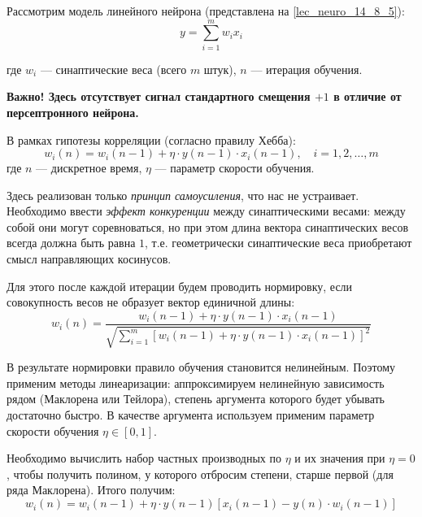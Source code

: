 \documentclass[a4paper]{article}
\numberwithin{equation}{subsection}
\begin{document}
Рассмотрим модель линейного нейрона (представлена на \ref{lec_neuro_14_8_5}):
\begin{equation}
    y = \sum_{i=1}^m w_i x_i
\end{equation}

\noindent
где $w_i$ --- синаптические веса (всего $m$ штук), $n$ --- итерация обучения.

\begin{myquote}
    \textbf{Важно!
    Здесь отсутствует сигнал стандартного смещения $+1$ в отличие от персептронного нейрона.}
\end{myquote}

В рамках гипотезы корреляции (согласно правилу Хебба):
\begin{equation}
    w_i (n) = w_i (n-1) + \eta \cdot y(n-1) \cdot x_i(n-1), \quad i=1, 2, \dots, m
\end{equation}
\noindent
где $n$ --- дискретное время, $\eta$ --- параметр скорости обучения.

Здесь реализован только \textit{принцип самоусиления}, что нас не устраивает. 
Необходимо ввести \textit{эффект конкуренции} между синаптическими весами: между собой они могут 
соревноваться, но при этом длина вектора синаптических весов всегда должна быть 
равна $1$, т.е. геометрически синаптические веса приобретают смысл направляющих косинусов.

Для этого после каждой итерации будем проводить нормировку, если совокупность весов не 
образует вектор единичной длины:
\begin{equation}
    w_i(n) = \dfrac{w_i(n-1) + \eta \cdot y(n-1) \cdot x_i(n-1)}
                   {\sqrt{\sum_{i=1}^{m} \left[ w_i(n-1) + \eta \cdot y(n-1) \cdot x_i(n-1) 
                                         \right] ^2}}
\end{equation}

В результате нормировки правило обучения становится нелинейным.
Поэтому применим методы линеаризации: аппроксимируем нелинейную зависимость рядом (Маклорена 
или Тейлора), степень аргумента которого будет убывать достаточно быстро.
В качестве аргумента используем применим параметр скорости обучения $\eta \in [0,1]$.

Необходимо вычислить набор частных производных по $\eta$ и их значения при $\eta=0$,
чтобы получить полином, у которого отбросим степени, старше первой (для ряда Маклорена). 
Итого получим:
\begin{equation}
    w_i(n) = w_i(n-1) + \eta \cdot y(n-1) \left[ x_i(n-1) - y(n) \cdot w_i(n-1) \right]
\end{equation}
\end{document}
